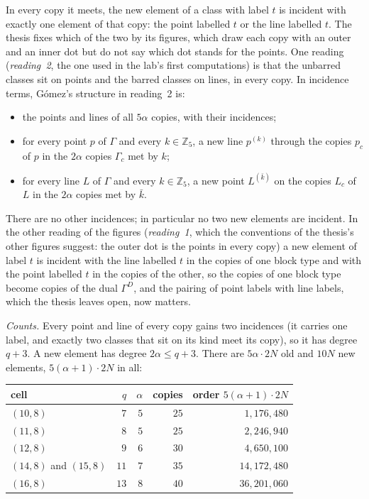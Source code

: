 \documentclass[11pt]{amsart}
\theoremstyle{definition}
\theoremstyle{remark}
\begin{document}
In every copy it meets, the new element of a class with label $t$ is incident with exactly one element of that copy: the point labelled $t$ or the line labelled $t$. The thesis fixes which of the two by its figures, which draw each copy with an outer and an inner dot but do not say which dot stands for the points. One reading (\emph{reading~2}, the one used in the lab's first computations) is that the unbarred classes sit on points and the barred classes on lines, in every copy. In incidence terms, G\'omez's structure in reading~2 is:
\begin{itemize}[leftmargin=1.5em]
\item the points and lines of all $5\alpha$ copies, with their incidences;
\item for every point $p$ of $\Gamma$ and every $k\in\mathbb{Z}_5$, a new line $p^{(k)}$ through the copies $p_c$ of $p$ in the $2\alpha$ copies $\Gamma_c$ met by $k$;
\item for every line $L$ of $\Gamma$ and every $k\in\mathbb{Z}_5$, a new point $L^{(\bar k)}$ on the copies $L_c$ of $L$ in the $2\alpha$ copies met by $\bar k$.
\end{itemize}
There are no other incidences; in particular no two new elements are incident. In the other reading of the figures (\emph{reading~1}, which the conventions of the thesis's other figures suggest: the outer dot is the points in every copy) a new element of label $t$ is incident with the line labelled $t$ in the copies of one block type and with the point labelled $t$ in the copies of the other, so the copies of one block type become copies of the dual $\Gamma^D$, and the pairing of point labels with line labels, which the thesis leaves open, now matters.

\emph{Counts.} Every point and line of every copy gains two incidences (it carries one label, and exactly two classes that sit on its kind meet its copy), so it has degree $q+3$. A new element has degree $2\alpha\le q+3$. There are $5\alpha\cdot2N$ old and $10N$ new elements, $5(\alpha+1)\cdot2N$ in all:

\begin{center}\small
\renewcommand{\arraystretch}{1.15}
\begin{tabular}{@{}lrrrr@{}}
\toprule
cell & $q$ & $\alpha$ & copies & order $5(\alpha+1)\cdot2N$\\
\midrule
$(10,8)$ & $7$ & $5$ & $25$ & $1{,}176{,}480$\\
$(11,8)$ & $8$ & $5$ & $25$ & $2{,}246{,}940$\\
$(12,8)$ & $9$ & $6$ & $30$ & $4{,}650{,}100$\\
$(14,8)$ and $(15,8)$ & $11$ & $7$ & $35$ & $14{,}172{,}480$\\
$(16,8)$ & $13$ & $8$ & $40$ & $36{,}201{,}060$\\
\bottomrule
\end{tabular}
\end{center}
\end{document}
